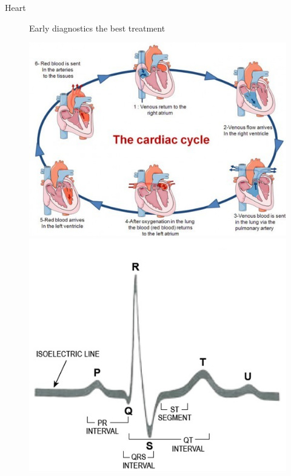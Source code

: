 \documentclass[t,12pt,english
\ifx\beamermode\undefined\else,\beamermode\fi
]{beamer}
\begin{document}
\begin{frame}{Heart}
\begin{figure}[!htb]
\begin{block}{\footnotesize{\tiny Early diagnostics the best treatment}}
\begin{enumerate}
\end{enumerate}
\end{block}

\endminipage
{}
\centering
\includegraphics[width=.6\textwidth]{1.jpg}\\
\includegraphics[width=.65\textwidth]{2.jpg}\\


\endminipage
\end{figure}

\end{frame}
\end{document}
